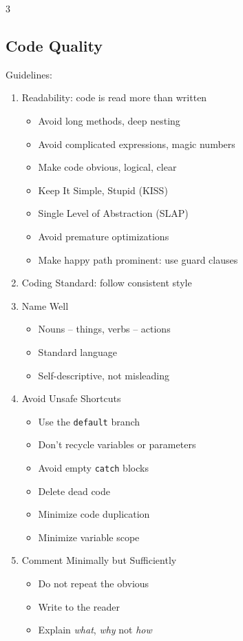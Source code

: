 \documentclass[12pt, a4paper]{article}
\begin{document}
\begin{multicols*}{3}
\subsection{Code Quality}
Guidelines:
\begin{enumerate}[\roman*.]
  \item Readability: code is read more than written
    \begin{itemize}[leftmargin=*]\vspace{3pt}
      \item Avoid long methods, deep nesting
      \item Avoid complicated expressions, magic numbers 
      \item Make code obvious, logical, clear
      \item Keep It Simple, Stupid (KISS)
      \item Single Level of Abstraction (SLAP)
      \item Avoid premature optimizations
      \item Make happy path prominent: use guard clauses
    \end{itemize}
  \item Coding Standard: follow consistent style 
  \item Name Well 
    \begin{itemize}[leftmargin=*]\vspace{3pt}
      \item Nouns -- things, verbs -- actions
      \item Standard language 
      \item Self-descriptive, not misleading
    \end{itemize}
  \item Avoid Unsafe Shortcuts 
    \begin{itemize}[leftmargin=*]\vspace{3pt}
      \item Use the \lstinline|default| branch 
      \item Don't recycle variables or parameters 
      \item Avoid empty \lstinline|catch| blocks 
      \item Delete dead code 
      \item Minimize code duplication 
      \item Minimize variable scope
    \end{itemize}
  \item Comment Minimally but Sufficiently
    \begin{itemize}[leftmargin=*]\vspace{3pt}
      \item Do not repeat the obvious
      \item Write to the reader
      \item Explain \textit{what}, \textit{why} not \textit{how}
    \end{itemize}
\end{enumerate}
\vspace{-1em}
\colbreak


\end{multicols*}
\end{document}
